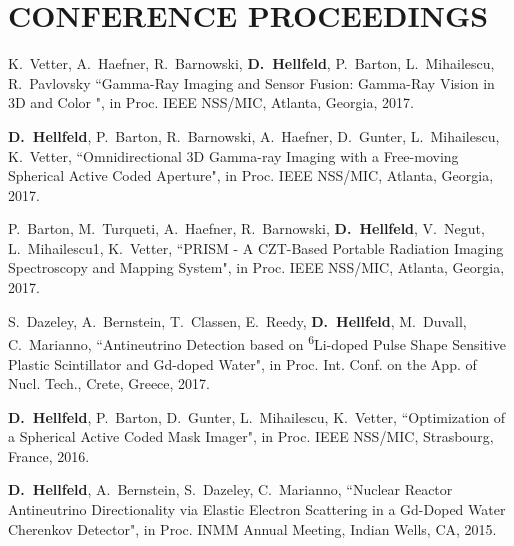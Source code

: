 \section{\small{CONFERENCE PROCEEDINGS}}

 \begin{thebibliography}{3}
 \raggedright
 \vspace{10pt}


 K.~Vetter, A.~Haefner, R.~Barnowski, \textbf{D.~Hellfeld}, P.~Barton, L.~Mihailescu, R.~Pavlovsky ``Gamma-Ray Imaging and Sensor Fusion: Gamma-Ray Vision in 3D and Color ", in Proc. IEEE NSS/MIC, Atlanta, Georgia, 2017. %

 \textbf{D.~Hellfeld}, P.~Barton, R.~Barnowski, A.~Haefner, D.~Gunter, L.~Mihailescu, K.~Vetter, ``Omnidirectional 3D Gamma-ray Imaging with a Free-moving Spherical Active Coded Aperture", in Proc. IEEE NSS/MIC, Atlanta, Georgia, 2017. %

 P.~Barton, M.~Turqueti, A.~Haefner, R.~Barnowski, \textbf{D.~Hellfeld}, V.~Negut, L.~Mihailescu1, K.~Vetter, ``PRISM - A CZT-Based Portable Radiation Imaging Spectroscopy and Mapping System", in Proc. IEEE NSS/MIC, Atlanta, Georgia, 2017. 

  S.~Dazeley, A.~Bernstein, T.~Classen, E.~Reedy, \textbf{D.~Hellfeld}, M.~Duvall, C.~Marianno, ``Antineutrino Detection based on \textsuperscript{6}Li-doped Pulse Shape Sensitive Plastic Scintillator and Gd-doped Water", in Proc. Int. Conf. on the App. of Nucl. Tech., Crete, Greece, 2017. %
 
  \textbf{D.~Hellfeld}, P.~Barton, D.~Gunter, L.~Mihailescu, K.~Vetter, ``Optimization of a Spherical Active Coded Mask Imager", in Proc. IEEE NSS/MIC, Strasbourg, France, 2016. %
 
 
  \textbf{D.~Hellfeld}, A.~Bernstein, S.~Dazeley, C.~Marianno, ``Nuclear Reactor Antineutrino Directionality via Elastic Electron Scattering in a Gd-Doped Water Cherenkov Detector", in Proc. INMM Annual Meeting, Indian Wells, CA, 2015. %

 \end{thebibliography}
